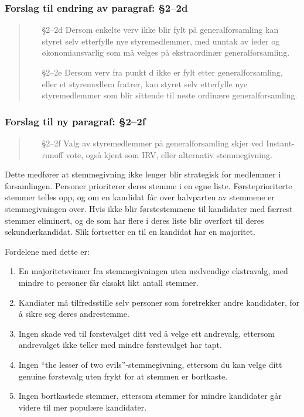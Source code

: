 \documentclass[10pt,norsk,a4paper]{article}
\begin{document}
\subsubsection{Forslag til endring av paragraf: §2--2d}
\begin{quote}
	\begin{enumerate}
		\item[§2--2d] Dersom enkelte verv ikke blir fylt på generalforsamling kan styret selv etterfylle nye styremedlemmer, med unntak av leder og økonomiansvarlig som må velges på ekstraordinær generalforsamling.
		\item[§2--2e] Dersom verv fra punkt d ikke er fylt etter generalforsamling, eller et styremedlem fratrer, kan styret selv etterfylle nye styremedlemmer som blir sittende til neste ordinære generalforsamling.
	\end{enumerate}
\end{quote}

\subsubsection{Forslag til ny paragraf: §2--2f}
\begin{quote}
	\begin{enumerate}
		\item[§2--2f] Valg av styremedlemmer på generalforsamling skjer ved Instant-runoff vote, også kjent som IRV, eller alternativ stemmegivning.
	\end{enumerate}
\end{quote}
Dette medfører at stemmegivning ikke lenger blir strategisk for medlemmer i forsamlingen. Personer prioriterer deres stemme i en egne liste. Førsteprioriterte stemmer telles opp, og om en kandidat får over halvparten av stemmene er stemmegivningen over. Hvis ikke blir førstestemmene til kandidater med færrest stemmer eliminert, og de som har flere i deres liste blir overført til deres sekundærkandidat. Slik fortsetter en til en kandidat har en majoritet.

Fordelene med dette er:
\begin{enumerate}
	\item En majoritetsvinner fra stemmegivningen uten nødvendige ekstravalg, med mindre to personer får eksakt likt antall stemmer.
	\item Kandiater må tilfredsstille selv personer som foretrekker andre kandidater, for å sikre seg deres andrestemme.
	\item Ingen skade ved til førstevalget ditt ved å velge ett andrevalg, ettersom andrevalget ikke teller med mindre førstevalget har tapt.
	\item Ingen ``the lesser of two evils''-stemmegivning, ettersom du kan velge ditt genuine førstevalg uten frykt for at stemmen er bortkaste.
	\item Ingen bortkastede stemmer, ettersom stemmer for mindre kandidater går videre til mer populære kandidater.
\end{enumerate}
\end{document}
